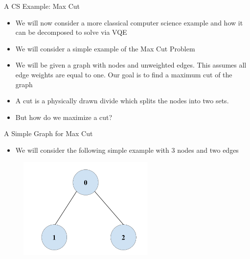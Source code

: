 

    



\begin{frame}{A CS Example: Max Cut}
    \begin{itemize}
        \item We will now consider a more classical computer science example and how it can be decomposed to solve via VQE
        \item We will consider a simple example of the Max Cut Problem
        \item We will be given a  graph with nodes and unweighted edges. This assumes all edge weights are equal to one. Our goal is to find a maximum cut of the graph
        \item A cut is a physically drawn divide which splits the nodes into two sets. 
        \item But how do we maximize a cut?
    \end{itemize}
\end{frame}

\begin{frame}{A Simple Graph for Max Cut}
    \begin{itemize}
        \item We will consider the following simple example with 3 nodes and two edges
    \end{itemize}
    \begin{figure}[h]
    \centering
    \includegraphics[width=0.6\textwidth]{400/Graph_MC.png}
    
\end{figure}
\end{frame}

